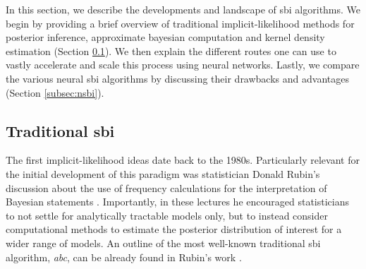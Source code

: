 In this section, we describe the developments and landscape of \gls*{sbi} algorithms. We begin by providing a brief overview of traditional implicit-likelihood methods for posterior inference, approximate bayesian computation and kernel density estimation (Section \ref{subsec:abc}). We then explain the different routes one can use to vastly accelerate and scale this process using neural networks. Lastly, we compare the various neural \gls*{sbi} algorithms by discussing their drawbacks and advantages (Section \ref{subsec:nsbi}). 


\subsection{Traditional \gls*{sbi}}  \label{subsec:abc}

The first implicit-likelihood ideas date back to the 1980s. Particularly relevant for the initial development of this paradigm was statistician Donald Rubin's discussion about the use of frequency calculations for the interpretation of Bayesian statements \cite{rubin1984bayesianly}. Importantly, in these lectures he encouraged statisticians to not settle for analytically tractable models only, but to instead consider computational methods to estimate the posterior distribution of interest for a wider range of models. An outline of the most well-known traditional \gls*{sbi} algorithm, \emph{\gls*{abc}}, can be already found in Rubin's work \cite[Section 3.1]{rubin1984bayesianly}. 

